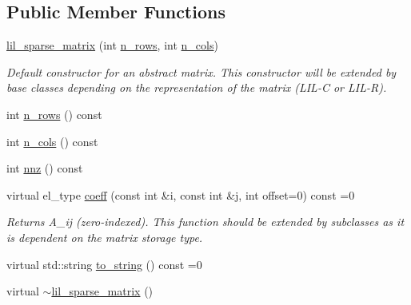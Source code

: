 \subsection*{Public Member Functions}
\begin{DoxyCompactItemize}
\item 
\hyperlink{classlil__sparse__matrix_a74dff1c9df79556341d714d4530ffe38}{lil\+\_\+sparse\+\_\+matrix} (int \hyperlink{classlil__sparse__matrix_a29e9ea5f7c8a9fca9029a91b39c592e0}{n\+\_\+rows}, int \hyperlink{classlil__sparse__matrix_ac88631204bcf7c9a223fb082a7d0cd3d}{n\+\_\+cols})\hypertarget{classlil__sparse__matrix_a74dff1c9df79556341d714d4530ffe38}{}\label{classlil__sparse__matrix_a74dff1c9df79556341d714d4530ffe38}

\begin{DoxyCompactList}\small\item\em Default constructor for an abstract matrix. This constructor will be extended by base classes depending on the representation of the matrix (L\+I\+L-\/C or L\+I\+L-\/R). \end{DoxyCompactList}\item 
int \hyperlink{classlil__sparse__matrix_a29e9ea5f7c8a9fca9029a91b39c592e0}{n\+\_\+rows} () const 
\item 
int \hyperlink{classlil__sparse__matrix_ac88631204bcf7c9a223fb082a7d0cd3d}{n\+\_\+cols} () const 
\item 
int \hyperlink{classlil__sparse__matrix_a40bc09d3b6716e57134eed0aeba49199}{nnz} () const 
\item 
virtual el\+\_\+type \hyperlink{classlil__sparse__matrix_a03af482b9f3d8c8b522dd5e49a2500ee}{coeff} (const int \&i, const int \&j, int offset=0) const =0
\begin{DoxyCompactList}\small\item\em Returns A\+\_\+ij (zero-\/indexed). This function should be extended by subclasses as it is dependent on the matrix storage type. \end{DoxyCompactList}\item 
virtual std\+::string \hyperlink{classlil__sparse__matrix_a5c2c43867660473176de5c73ebdac7be}{to\+\_\+string} () const =0
\item 
virtual \hyperlink{classlil__sparse__matrix_aebd4e61eeb73f709d0900cc064d8986d}{$\sim$lil\+\_\+sparse\+\_\+matrix} ()
\end{DoxyCompactItemize}
